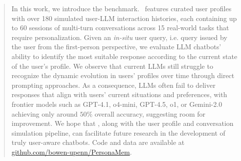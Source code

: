 \begin{abstract}
In this work, we introduce the \textit{\datasetnameemoji} benchmark. \datasetname~features curated user profiles with over 180 simulated user-LLM interaction histories, each containing up to 60 sessions of multi-turn conversations across 15 real-world tasks that require personalization. Given an \emph{in-situ} user query, i.e. query issued by the user from the first-person perspective,  
we evaluate LLM chatbots' ability to identify the most suitable response according to the current state of the user's profile. 
We observe that current LLMs still struggle to recognize the dynamic evolution in users' profiles over time through direct prompting approaches. As a consequence, LLMs often fail to deliver responses that align with users' current situations and preferences, with frontier models such as GPT-4.1, o4-mini, GPT-4.5, o1, or Gemini-2.0 achieving only around $50\%$ overall accuracy, suggesting room for improvement. We hope that \datasetname, along with the user profile and conversation simulation pipeline, can facilitate future research in the development of truly user-aware chatbots.
Code and data are available at \href{https://github.com/bowen-upenn/PersonaMem}{github.com/bowen-upenn/PersonaMem}.




\end{abstract}
